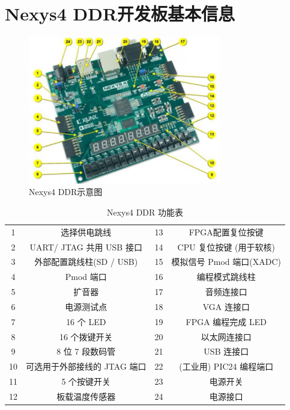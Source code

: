 \appendix
\section{Nexys4 DDR开发板基本信息}

\begin{figure}[htbp]
    \centering
    \includegraphics[width = 0.75\textwidth]{image/appendix/appendix_a_0.png}
    \caption{Nexys4 DDR示意图}
    \label{fig:appendix_a_0}
\end{figure}

\begin{table}[htbp]
    \centering
    \begin{tabular}{cc|cc}
         1& 选择供电跳线 &   13 & FPGA配置复位按键 \\
         2& UART/ JTAG 共用 USB 接口 &   14 & CPU 复位按键 (用于软核)\\
         3& 外部配置跳线柱(SD / USB) &   15& 模拟信号 Pmod 端口(XADC)\\
         4& Pmod 端口 &   16&编程模式跳线柱 \\
         5& 扩音器 &   17&音频连接口 \\
         6& 电源测试点 &   18& VGA 连接口\\
         7& 16 个 LED &   19& FPGA 编程完成 LED\\
         8& 16 个拨键开关&   20&以太网连接口 \\
         9& 8 位 7 段数码管&   21&USB 连接口 \\
         10& 可选用于外部接线的 JTAG 端口&  22&(工业用) PIC24 编程端口 \\
         11& 5 个按键开关 &  23& 电源开关\\
         12& 板载温度传感器 &  24&电源接口 \\
    \end{tabular}
    \caption{Nexys4 DDR 功能表}
    \label{tab:my_label}
\end{table}

